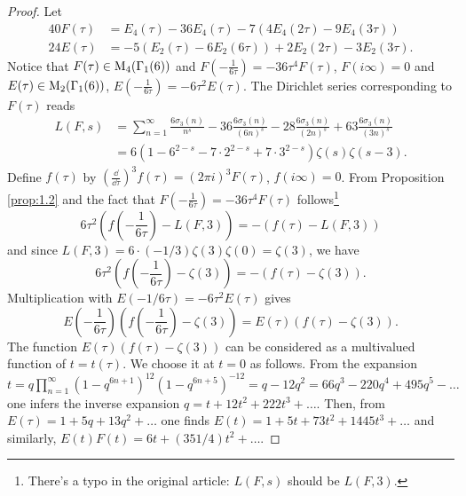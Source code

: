 \begin{proof}
    Let
    \begin{align*}
        40 F(\tau) &= E_4(\tau) - 36 E_4(\tau) - 7 (4E_4(2\tau) - 9E_4(3\tau)) \\
        24 E(\tau) &= -5(E_2(\tau) - 6E_2(6\tau)) + 2E_2(2\tau) - 3E_2(3\tau).
    \end{align*}
    Notice that $F(\tau) \in \mathrm{M}_4(\Gamma_1(6))$ and $F(-\frac{1}{6\tau}) = -36 \tau^4 F(\tau)$, $F(i\infty) = 0$ and $E(\tau) \in \mathrm{M}_2(\Gamma_1(6))$, $E(-\frac{1}{6\tau}) =  - 6\tau^2 E(\tau)$.
    The Dirichlet series corresponding to $F(\tau)$ reads
    \begin{align*}
        L(F, s) &= \sum_{n=1}^{\infty} \frac{6\sigma_3(n)}{n^s} - 36 \frac{6 \sigma_3(n)}{(6n)^s} - 28 \frac{6 \sigma_3(n)}{(2n)^s} + 63 \frac{6 \sigma_3(n)}{(3n)^s} \\
        &= 6(1 - 6^{2-s} - 7 \cdot 2^{2-s} + 7 \cdot 3^{2-s}) \zeta(s) \zeta(s - 3).
    \end{align*}
    Define $f(\tau)$ by $(\frac{\dd}{\dd \tau})^{3} f(\tau) = (2 \pi i )^{3} F(\tau)$, $f(i \infty) = 0$.
    From Proposition \ref{prop:1.2} and the fact that $F(-\frac{1}{6\tau}) = -36 \tau^4 F(\tau)$ follows\footnote{There's a typo in the original article: $L(F, s)$ should be $L(F, 3)$.}
    $$
        6 \tau^2 \left(f\left(-\frac{1}{6\tau}\right) - L(F, 3)\right) = -(f(\tau) - L(F, 3))
    $$
    and since $L(F, 3) = 6 \cdot (-1/3) \zeta(3) \zeta(0) = \zeta(3)$, we have
    $$
        6 \tau^2 \left(f\left(-\frac{1}{6\tau}\right) - \zeta(3)\right) = -(f(\tau) - \zeta(3)).
    $$
    Multiplication with $E(-1/6\tau) = -6\tau^2 E(\tau)$ gives
    \begin{equation}
        \label{eqn:2}
        E\left(-\frac{1}{6\tau}\right) \left(f\left(-\frac{1}{6 \tau}\right) - \zeta(3)\right) = E(\tau) (f(\tau) - \zeta(3)).
    \end{equation}
    The function $E(\tau)(f(\tau) - \zeta(3))$ can be considered as a multivalued function of $t = t(\tau)$.
    We choose it at $t = 0$ as follows.
    From the expansion $t = q\prod_{n=1}^{\infty} (1 - q^{6n + 1})^{12} (1 - q^{6n + 5})^{-12} = q - 12q^2 = 66q^3 - 220q^4 + 495 q^5 - \dots$ one infers the inverse expansion $q = t + 12 t^2 + 222 t^3 + \dots$.
    Then, from $E(\tau) = 1 + 5q + 13 q^2 + \dots$ one finds $E(t) = 1 + 5t + 73 t^2 + 1445 t^3 + \dots$ and similarly, $E(t) F(t) = 6t + (351/4)t^2 + \dots$.


\end{proof}
